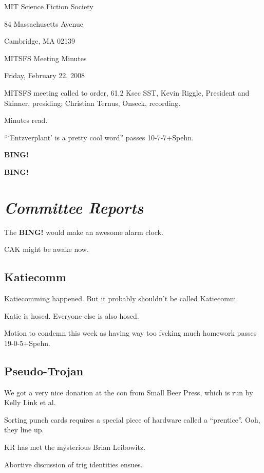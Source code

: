\documentclass[10pt]{article}
\newcommand{\bing}{{\bf BING!} }
\newcommand{\goto}[1]{\bing \vskip 12pt \section*{{\em{#1}}}}
\begin{document}
\begin{center}

MIT Science Fiction Society

84 Massachusetts Avenue

Cambridge, MA 02139

\vspace{12pt}

MITSFS Meeting Minutes

Friday, February 22, 2008

\end{center}

\vspace{18pt}

\setlength{\parskip}{6pt}

\noindent
MITSFS meeting called to order, 61.2 Ksec SST,
Kevin Riggle, President and Skinner, presiding; Christian Ternus, Onseck, recording.

Minutes read.

```Entzverplant' is a pretty cool word'' passes 10-7-7+Spehn.

\bing

\goto{Committee Reports}

The \bing would make an awesome alarm clock.

CAK might be awake now.

\subsection*{Katiecomm}

Katiecomming happened.  But it probably shouldn't be called Katiecomm.

Katie is hosed.  Everyone else is also hosed.

Motion to condemn this week as having way too fvcking much homework passes 19-0-5+Spehn.

\subsection*{Pseudo-Trojan}

We got a very nice donation at the con from Small Beer Press, which is run by Kelly Link et al.

Sorting punch cards requires a special piece of hardware called a ``prentice''.  Ooh, they line up.

KR has met the mysterious Brian Leibowitz.

Abortive discussion of trig identities ensues.
\end{document}
